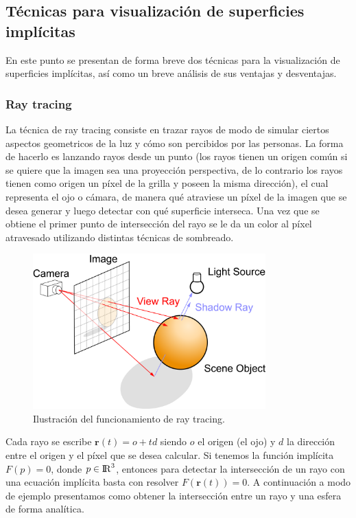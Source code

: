 \documentclass[12pt]{article}
\begin{document}
\subsection{Técnicas para visualización de superficies implícitas}
En este punto se presentan de forma breve dos técnicas para la visualización de superficies implícitas, así como un breve análisis de sus ventajas y desventajas.
\subsubsection{Ray tracing}
La técnica de ray tracing consiste en trazar rayos de modo de simular ciertos aspectos geometricos de la luz y cómo son percibidos por las personas. La forma de hacerlo es lanzando rayos desde un punto (los rayos tienen un origen común si se quiere que la imagen sea una proyección perspectiva, de lo contrario los rayos tienen como origen un píxel de la grilla y poseen la misma dirección), el cual representa el ojo o cámara,  de manera qué atraviese un píxel de la imagen que se desea generar y luego detectar con qué superficie interseca. Una vez que se obtiene el primer punto de intersección del rayo se le da un color al píxel atravesado utilizando distintas técnicas de sombreado.
\clearpage
\begin{figure}[h!]
\includegraphics[width=0.8\textwidth,center]{raytrace.png}
\caption{Ilustración del funcionamiento de ray tracing.}
\end{figure}
Cada rayo se escribe $\textbf{r}(t)= o +td$ siendo $o$ el origen (el ojo) y $d$ la dirección entre el origen y el píxel que se desea calcular. Si tenemos la función implícita $F(p)=0$, donde $p \in {\rm I\!R} ^3 $, entonces para detectar la intersección de un rayo con una ecuación implícita basta con resolver $F(\textbf{r}(t))=0$.
A continuación a modo de ejemplo presentamos como obtener la intersección entre un rayo y una esfera de forma analítica\cite{realtimerendering}.
\end{document}

